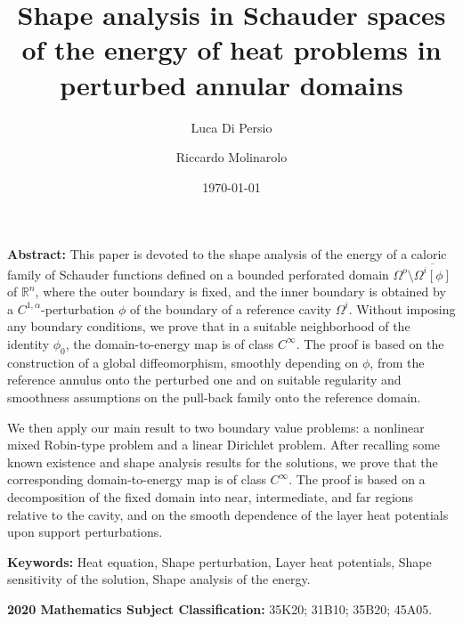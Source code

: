 \documentclass[11pt,reqno,a4paper]{amsart}
\theoremstyle{plain}
\theoremstyle{definition}
\newcommand{\R}{\mathbb{R}}
\begin{document}
\author{Luca Di Persio}
\address[L.\,Di Persio]{Dipartimento di Informatica, Universit\`a degli Studi di Verona, Strada le Grazie 15, 37134 Verona, Italy}
\author{Riccardo Molinarolo}
\address[R.\,Molinarolo]{Dipartimento di Informatica, Universit\`a degli Studi di Verona, Strada le Grazie 15, 37134 Verona, Italy}

\title[]{Shape analysis in Schauder spaces of the energy of heat problems in perturbed annular domains}

\date{\today}

\maketitle

\noindent
{\textbf{Abstract:}} This paper is devoted to the shape analysis of the energy of a caloric family of Schauder functions defined on a bounded perforated domain $\Omega^o \setminus \overline{\Omega^i[\phi]}$ of $\R^n$, where the outer boundary is fixed, and the inner boundary is obtained by a $C^{1,\alpha}$-perturbation $\phi$ of the boundary of a reference cavity $\Omega^i$. Without imposing any boundary conditions, we prove that in a suitable neighborhood of the identity $\phi_0$, the domain-to-energy map is of class $C^{\infty}$. The proof is based on the construction of a global diffeomorphism, smoothly depending on $\phi$, from the reference annulus onto the perturbed one and on suitable regularity and smoothness assumptions on the pull-back family onto the reference domain.

We then apply our main result to two boundary value problems: a nonlinear mixed Robin-type problem and a linear Dirichlet problem. After recalling some known existence and shape analysis results for the solutions, we prove that the corresponding domain-to-energy map is of class $C^{\infty}$. The proof is based on a decomposition of the fixed domain into near, intermediate, and far regions relative to the cavity, and on the smooth dependence of the layer heat potentials upon support perturbations.

\vspace{9pt}

\noindent
{\textbf{Keywords:}} Heat equation, Shape perturbation, Layer heat potentials, Shape sensitivity of the solution, Shape analysis of the energy. 
\vspace{9pt}

\noindent   
{\textbf{2020 Mathematics Subject Classification:}}  35K20; 31B10; 35B20;  45A05.
\end{document}
